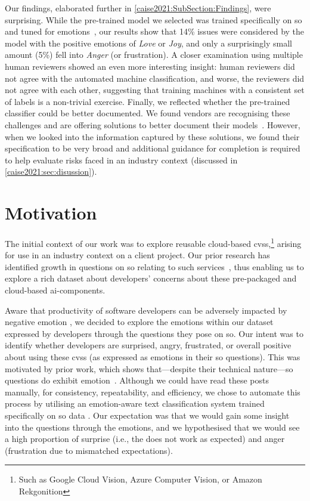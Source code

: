 Our findings, elaborated further in \cref{caise2021:SubSection:Findings}, were surprising. While the pre-trained model we selected was trained specifically on \gls{so} and tuned for emotions~\citep{novielli2018,calefato2017}, our results show that 14\% issues were considered by the model with the positive emotions of \textit{Love} or \textit{Joy}, and only a surprisingly small amount (5\%) fell into \textit{Anger} (or frustration). A closer examination using multiple human reviewers showed an even more interesting insight: human reviewers did not agree with the automated machine classification, and worse, the reviewers did not agree with each other, suggesting that training machines with a consistent set of labels is a non-trivial exercise.  Finally, we reflected whether the pre-trained classifier could be better documented.  We found vendors are recognising these challenges and are offering solutions to better document their models~\citep{Mitchell:2018in, Gebru:2018wh}. However, when we looked into the information captured by these solutions, we found their specification to be very broad and additional guidance for completion is required to help evaluate risks faced in an industry context (discussed in \cref{caise2021:sec:disussion}). 

\section{Motivation}\label{caise2021:sec:study}

The initial context of our work was to explore reusable cloud-based \glspl{cvs},\footnote{Such as Google Cloud Vision, Azure Computer Vision, or Amazon Rekgonition} arising for use in an industry context on a client project. Our prior research has identified growth in questions on \gls{so} relating to such services~\citep{Cummaudo:2020icse}, thus enabling us to explore a rich dataset about developers' concerns about these pre-packaged and cloud-based \gls{ai}-components.

Aware that productivity of software developers can be adversely impacted by negative emotion \citep{wrobel2013}, we decided to explore the emotions within our dataset expressed by developers through the questions they pose on \gls{so}. Our intent was to identify whether developers are surprised, angry, frustrated, or overall positive about using these \glspl{cvs} (as expressed as emotions in their \gls{so} questions). This was motivated by prior work,  which shows that---despite their technical nature---\gls{so} questions do exhibit emotion~\citep{Novielli:2015vda, calefato2017}.  Although we could have read these posts manually, for consistency, repeatability, and efficiency, we chose to automate this process by utilising an emotion-aware text classification system trained specifically on \gls{so} data \citep{novielli2018}. Our expectation was that we would gain some insight into the questions through the emotions, and we hypothesised that we would see a high proportion of surprise (i.e., the  does not work as expected) and anger (frustration due to mismatched expectations).

